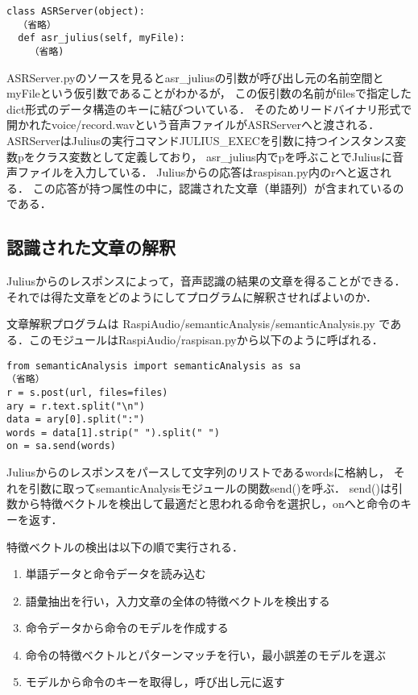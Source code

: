 \documentclass{jsarticle}
\begin{document}
\begin{multicols}{2}
\begin{lstlisting}[caption=RaspiAudio/ASRServer.py]
class ASRServer(object):
  （省略）
  def asr_julius(self, myFile):
    （省略)
\end{lstlisting}

ASRServer.pyのソースを見るとasr\_juliusの引数が呼び出し元の名前空間とmyFileという仮引数であることがわかるが，
この仮引数の名前がfilesで指定したdict形式のデータ構造のキーに結びついている．
そのためリードバイナリ形式で開かれたvoice/record.wavという音声ファイルがASRServerへと渡される．
ASRServerはJuliusの実行コマンドJULIUS\_EXECを引数に持つインスタンス変数pをクラス変数として定義しており，
asr\_julius内でpを呼ぶことでJuliusに音声ファイルを入力している．
Juliusからの応答はraspisan.py内のrへと返される．
この応答が持つ属性の中に，認識された文章（単語列）が含まれているのである．

\subsection{認識された文章の解釈}

Juliusからのレスポンスによって，音声認識の結果の文章を得ることができる．
それでは得た文章をどのようにしてプログラムに解釈させればよいのか．

文章解釈プログラムは
RaspiAudio/semanticAnalysis/semanticAnalysis.py
である．このモジュールはRaspiAudio/raspisan.pyから以下のように呼ばれる．

\begin{lstlisting}[caption=RaspiAudio/raspisan.py]
from semanticAnalysis import semanticAnalysis as sa
（省略）
r = s.post(url, files=files)
ary = r.text.split("\n")
data = ary[0].split(":")
words = data[1].strip(" ").split(" ")
on = sa.send(words)
\end{lstlisting}

Juliusからのレスポンスをパースして文字列のリストであるwordsに格納し，
それを引数に取ってsemanticAnalysisモジュールの関数send()を呼ぶ．
send()は引数から特徴ベクトルを検出して最適だと思われる命令を選択し，onへと命令のキーを返す．

特徴ベクトルの検出は以下の順で実行される．
\begin{enumerate}
\item 単語データと命令データを読み込む
\item 語彙抽出を行い，入力文章の全体の特徴ベクトルを検出する
\item 命令データから命令のモデルを作成する
\item 命令の特徴ベクトルとパターンマッチを行い，最小誤差のモデルを選ぶ
\item モデルから命令のキーを取得し，呼び出し元に返す
\end{enumerate}


\end{multicols}
\end{document}

